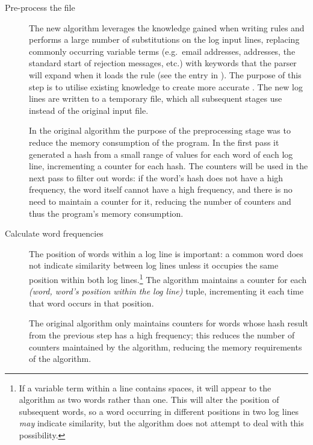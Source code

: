 \begin{description}

    \item [Pre-process the file]  The new algorithm leverages the knowledge
        gained when writing rules and performs a large number of
        substitutions on the log input lines, replacing commonly occurring
        variable terms (e.g.\ email addresses, \IP{} addresses, the
        standard start of rejection messages, etc.) with \regex{} keywords
        that the parser will expand when it loads the rule (see the
        \regex{} entry in ).  The purpose of
        this step is to utilise existing knowledge to create more accurate
        \regexes{}.  The new log lines are written to a temporary file,
        which all subsequent stages use instead of the original input file.

        In the original algorithm the purpose of the preprocessing stage
        was to reduce the memory consumption of the program.  In the first
        pass it generated a hash from a small range of values for each word
        of each log line, incrementing a counter for each hash.  The
        counters will be used in the next pass to filter out words: if the
        word's hash does not have a high frequency, the word itself cannot
        have a high frequency, and there is no need to maintain a counter
        for it, reducing the number of counters and thus the program's
        memory consumption.

    \item [Calculate word frequencies]  The position of words within a log
        line is important: a common word does not indicate similarity
        between log lines unless it occupies the same position within both
        log lines.\footnote{If a variable term within a line contains
        spaces, it will appear to the algorithm as two words rather than
        one.  This will alter the position of subsequent words, so a word
        occurring in different positions in two log lines \textit{may\/}
        indicate similarity, but the algorithm does not attempt to deal
        with this possibility.}  The algorithm maintains a counter for each
        \textit{(word, word's position within the log line)\/} tuple,
        incrementing it each time that word occurs in that position.

        The original algorithm only maintains counters for words whose hash
        result from the previous step has a high frequency; this reduces
        the number of counters maintained by the algorithm, reducing the
        memory requirements of the algorithm.
        

\end{description}
